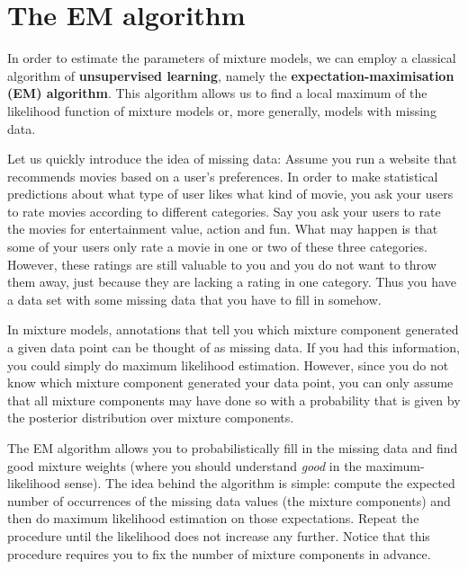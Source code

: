 \section{The EM algorithm}

In order to estimate the parameters of mixture models, we can employ a classical algorithm of 
\textbf{unsupervised learning}, namely the \textbf{expectation-maximisation (EM) algorithm}. This
algorithm allows us to find a local maximum of the likelihood function of mixture models or, more
generally, models with missing data. 

Let us quickly introduce the idea of missing data: Assume you run a website that recommends movies
based on a user's preferences. In order to make statistical predictions about what type of user
likes what kind of movie, you ask your users to rate movies according to different categories.
Say you ask your users to rate the movies for entertainment value, action and fun. What may happen is
that some of your users only rate a movie in one or two of these three categories. However, these
ratings are still valuable to you and you do not want to throw them away, just because they are lacking
a rating in one category. Thus you have a data set with some missing data that you have to fill in somehow.

\medskip 
In mixture models, annotations that tell you which mixture component
generated a given data point can be thought of as missing data. If you had this information, you could simply do maximum likelihood estimation.
However, since you do not know which mixture component generated your data point, you can only
assume that all mixture components may have done so with a probability that is given by the posterior distribution
over mixture components.

The EM algorithm allows you to probabilistically fill in the missing data and find good mixture weights
(where you should understand \textit{good} in the maximum-likelihood sense). The idea behind the
algorithm is simple: compute the expected number of occurrences of the missing data values (the mixture 
components) and then do maximum likelihood estimation on those expectations. Repeat the procedure 
until the likelihood does not increase any further. Notice that this procedure requires you to
fix the number of mixture components in advance.

